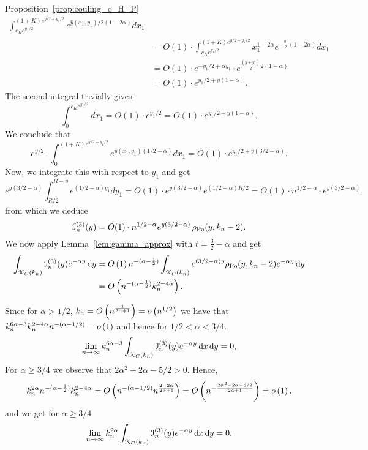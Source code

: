 \begin{proofof}{Proposition~\ref{prop:couling_c_H_P}}
\begin{align*}
\int_{c_K e^{y_1/2}}^{(1+K)e^{y/2 + y_1/2}} e^{\hat{y}(x_1,y_1)/2 (1 -2\alpha)} dx_1  \\
&= O(1)\cdot \int_{c_K e^{y_1/2}}^{(1+K)e^{y/2 + y_1/2}} x_1^{1 -2\alpha} 
e^{-\frac{y_1}{2} (1-2\alpha)} dx_1 \\
&= O(1) \cdot e^{-y_1/2 + \alpha y_1} \cdot e^{\frac{(y+y_1)}{2} 2(1-\alpha)} \\
&=O(1) \cdot e^{y_1/2 +y(1-\alpha)}.  
\end{align*}
The second integral trivially gives: 
\[
	\int_0^{c_K e^{y_1/2}} dx_1 = O(1) \cdot e^{y_1/2} = O(1) \cdot e^{y_1/2 +y(1-\alpha)}.
\]
We conclude that 
\[
	e^{y/2} \cdot \int_0^{(1+K)e^{y/2 + y_1/2}} e^{\hat{y}(x_1,y_1) (1/2 -\alpha)} dx_1 = 
	O(1) \cdot e^{y_1/2 +y(3/2-\alpha)}.
\]
Now, we integrate this with respect to $y_1$ and get 
\[
	e^{y(3/2 -\alpha)} \int_{R/2}^{R-y} e^{(1/2-\alpha)y_1} dy_1 =  O(1) \cdot e^{y(3/2 -\alpha)} 
	e^{(1/2 -\alpha) R/2} = O(1) \cdot n^{1/2 -\alpha} \cdot e^{y(3/2 - \alpha)},
\]
from which we deduce
\begin{equation} \label{eq:term3_intermediate}
	\mathcal{I}_n^{(3)}(y) = 
	O(1) \cdot n^{1/2 -\alpha} e^{y(3/2 - \alpha)} \, \rho_{{\mathrm{Po}}}(y,k_n-2). 
\end{equation}
We now apply Lemma~\ref{lem:gamma_approx} with $t = \frac{3}{2} - \alpha$ and get 
\begin{align*}
	\int_{{\mathcal K}_{C}(k_n)} \mathcal{I}_n^{(3)}(y) e^{-\alpha y} \operatorname{\mathrm{d}\hspace{-2pt}} y
	&= O\left(1\right) n^{-(\alpha - \frac{1}{2})} \int_{{\mathcal K}_{C}(k_n)} e^{(3/2 - \alpha)y} \rho_{{\mathrm{Po}}}(y,k_n-2) e^{-\alpha y} 
		\operatorname{\mathrm{d}\hspace{-2pt}} y\\
	&= O\left(n^{-(\alpha - \frac{1}{2})} k_n^{2 -4\alpha}\right).
\end{align*}

Since for $\alpha > 1/2$, $k_n = O\left(n^{\frac{1}{2\alpha +1}}\right) = o\left(n^{1/2}\right)$ we have that $k_n^{6\alpha - 3} k_n^{2 - 4\alpha} n^{-(\alpha - 1/2)} = o\left(1\right)$ and hence for $1/2 < \alpha < 3/4$.
\[
	\lim_{n \to \infty} k_n^{6\alpha - 3} \int_{{\mathcal K}_{C}(k_n)} \mathcal{I}_n^{(3)}(y) e^{-\alpha y} \operatorname{\mathrm{d}\hspace{-2pt}} x \operatorname{\mathrm{d}\hspace{-2pt}} y = 0,
\]
For $\alpha \ge 3/4$ we observe that $2\alpha^2 + 2\alpha - 5/2 > 0$. Hence,
\[
	k_n^{2\alpha} n^{-(\alpha - \frac{1}{2})} k_n^{2 -4\alpha} 
	= O\left(n^{-(\alpha - 1/2)} n^{\frac{2 - 2\alpha}{2\alpha + 1}}\right)
 	= O\left(n^{- \frac{2\alpha^2 + 2\alpha - 5/2}{2\alpha + 1}}\right) = o\left(1\right).
\]
and we get for $\alpha \ge 3/4$
\[
	\lim_{n \to \infty} k_n^{2\alpha} \int_{{\mathcal K}_{C}(k_n)} \mathcal{I}_n^{(3)}(y) e^{-\alpha y} \operatorname{\mathrm{d}\hspace{-2pt}} x \operatorname{\mathrm{d}\hspace{-2pt}} y = 0.
\]




\end{proofof}
